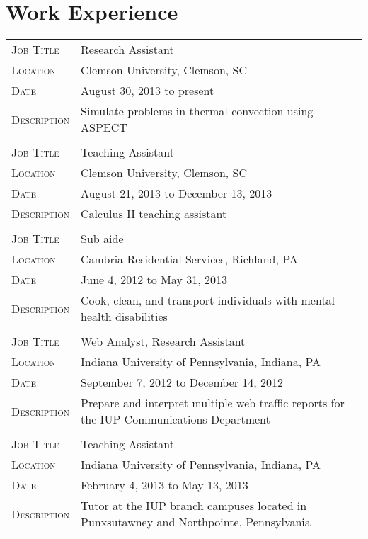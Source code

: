 \documentclass[10pt]{article}
\begin{document}
\section{Work Experience}
\begin{tabularx}{0.97\linewidth}{>{\raggedleft\scshape}p{3cm}X}
  Job Title    & Research Assistant\\
  Location     & Clemson University, Clemson, SC\\
  Date         & August 30, 2013 to present\\
  Description  & Simulate problems in thermal convection using ASPECT\\
               & \\
  Job Title    & Teaching Assistant\\
  Location     & Clemson University, Clemson, SC\\
  Date         & August 21, 2013 to December 13, 2013\\
  Description  & Calculus II teaching assistant\\
               & \\
  Job Title    & Sub aide\\
  Location     & Cambria Residential Services, Richland, PA\\
  Date         & June 4, 2012 to May 31, 2013  \\
  Description  & Cook, clean, and transport individuals with mental health disabilities\\
               & \\
  Job Title    & Web Analyst, Research Assistant\\
  Location     & Indiana University of Pennsylvania, Indiana, PA\\
  Date         & September 7, 2012 to December 14, 2012\\
  Description  & Prepare and interpret multiple web traffic reports for the IUP Communications Department\\
               & \\
  Job Title    & Teaching Assistant\\
  Location     & Indiana University of Pennsylvania, Indiana, PA\\
  Date         & February 4, 2013 to May 13, 2013\\
  Description  & Tutor at the IUP branch campuses located in Punxsutawney and Northpointe, Pennsylvania\\
\end{tabularx}
\end{document}
